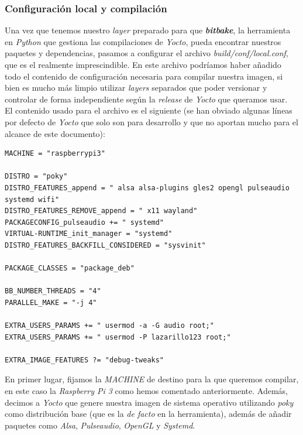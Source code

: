 \subsubsection{Configuración local y compilación}

Una vez que tenemos nuestro \textit{layer} preparado para que \textbf{\textit{bitbake}}, la herramienta en \textit{Python} que gestiona las compilaciones de \textit{Yocto}, pueda encontrar nuestros paquetes y dependencias, pasamos a configurar el archivo \emph{build/conf/local.conf}, que es el realmente imprescindible. En este archivo podríamos haber añadido todo el contenido de configuración necesaria para compilar nuestra imagen, si bien es mucho más limpio utilizar \textit{layers} separados que poder versionar y controlar de forma independiente según la \textit{release} de \textit{Yocto} que queramos usar.\\

El contenido usado para el archivo es el siguiente (se han obviado algunas líneas por defecto de \textit{Yocto} que solo son para desarrollo y que no aportan mucho para el alcance de este documento):

\begin{lstlisting}
MACHINE = "raspberrypi3"

DISTRO = "poky"
DISTRO_FEATURES_append = " alsa alsa-plugins gles2 opengl pulseaudio systemd wifi"
DISTRO_FEATURES_REMOVE_append = " x11 wayland"
PACKAGECONFIG_pulseaudio += " systemd"
VIRTUAL-RUNTIME_init_manager = "systemd"
DISTRO_FEATURES_BACKFILL_CONSIDERED = "sysvinit"

PACKAGE_CLASSES = "package_deb"

BB_NUMBER_THREADS = "4"
PARALLEL_MAKE = "-j 4"

EXTRA_USERS_PARAMS += " usermod -a -G audio root;"
EXTRA_USERS_PARAMS += " usermod -P lazarillo123 root;"

EXTRA_IMAGE_FEATURES ?= "debug-tweaks"
\end{lstlisting}


En primer lugar, fijamos la \emph{MACHINE} de destino para la que queremos compilar, en este caso la \textit{Raspberry Pi 3} como hemos comentado anteriormente. Además, decimos a \textit{Yocto} que genere nuestra imagen de sistema operativo utilizando \emph{poky} como distribución base (que es la \textit{de facto} en la herramienta), además de añadir paquetes como \textit{Alsa}, \textit{Pulseaudio}, \textit{OpenGL} y \textit{Systemd}.\\

